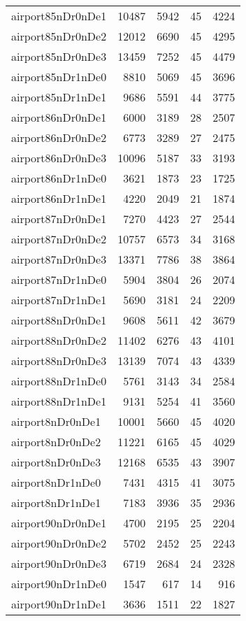\begin{longtable}{lrrrr}
airport85nDr0nDe1 & 10487 & 5942 & 45 & 4224 \\
airport85nDr0nDe2 & 12012 & 6690 & 45 & 4295 \\
airport85nDr0nDe3 & 13459 & 7252 & 45 & 4479 \\
airport85nDr1nDe0 & 8810 & 5069 & 45 & 3696 \\
airport85nDr1nDe1 & 9686 & 5591 & 44 & 3775 \\
airport86nDr0nDe1 & 6000 & 3189 & 28 & 2507 \\
airport86nDr0nDe2 & 6773 & 3289 & 27 & 2475 \\
airport86nDr0nDe3 & 10096 & 5187 & 33 & 3193 \\
airport86nDr1nDe0 & 3621 & 1873 & 23 & 1725 \\
airport86nDr1nDe1 & 4220 & 2049 & 21 & 1874 \\
airport87nDr0nDe1 & 7270 & 4423 & 27 & 2544 \\
airport87nDr0nDe2 & 10757 & 6573 & 34 & 3168 \\
airport87nDr0nDe3 & 13371 & 7786 & 38 & 3864 \\
airport87nDr1nDe0 & 5904 & 3804 & 26 & 2074 \\
airport87nDr1nDe1 & 5690 & 3181 & 24 & 2209 \\
airport88nDr0nDe1 & 9608 & 5611 & 42 & 3679 \\
airport88nDr0nDe2 & 11402 & 6276 & 43 & 4101 \\
airport88nDr0nDe3 & 13139 & 7074 & 43 & 4339 \\
airport88nDr1nDe0 & 5761 & 3143 & 34 & 2584 \\
airport88nDr1nDe1 & 9131 & 5254 & 41 & 3560 \\
airport8nDr0nDe1 & 10001 & 5660 & 45 & 4020 \\
airport8nDr0nDe2 & 11221 & 6165 & 45 & 4029 \\
airport8nDr0nDe3 & 12168 & 6535 & 43 & 3907 \\
airport8nDr1nDe0 & 7431 & 4315 & 41 & 3075 \\
airport8nDr1nDe1 & 7183 & 3936 & 35 & 2936 \\
airport90nDr0nDe1 & 4700 & 2195 & 25 & 2204 \\
airport90nDr0nDe2 & 5702 & 2452 & 25 & 2243 \\
airport90nDr0nDe3 & 6719 & 2684 & 24 & 2328 \\
airport90nDr1nDe0 & 1547 & 617 & 14 & 916 \\
airport90nDr1nDe1 & 3636 & 1511 & 22 & 1827 \\

\end{longtable}

